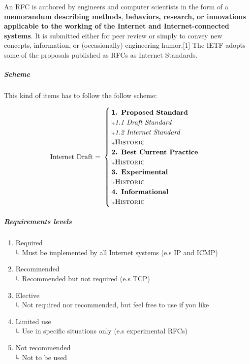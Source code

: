 An RFC is authored by engineers and computer scientists in the form of a \textbf{memorandum describing methods}, \textbf{behaviors, research, or innovations applicable to the working of the Internet and Internet-connected systems}. It is submitted either for peer review or simply to convey new concepts, information, or (occasionally) engineering humor.[1] The IETF adopts some of the proposals published as RFCs as Internet Standards.

\subparagraph{Scheme}
This kind of items has to follow the follow scheme:

\begin{equation}\text{Internet Draft = }
\begin{cases}
\text{\textbf{1. Proposed Standard}}\\\rotatebox[origin=c]{180}{$\Lsh$} \text{\textit{1.1 Draft Standard}}\\
\rotatebox[origin=c]{180}{$\Lsh$}
\text{\textit{1.2 Internet Standard}} \\ \rotatebox[origin=c]{180}{$\Lsh$} \text{\textsc{Historic}}\\
\text{\textbf{2. Best Current Practice}} \\ \rotatebox[origin=c]{180}{$\Lsh$} \text{\textsc{Historic}}\\
\text{\textbf{3. Experimental}}\\ \rotatebox[origin=c]{180}{$\Lsh$} \text{\textsc{Historic}}\\
\text{\textbf{4. Informational}}\\ \rotatebox[origin=c]{180}{$\Lsh$} \text{\textsc{Historic}}         
\end{cases}
\end{equation}

\subparagraph{Requirements levels}
\begin{enumerate}
\item Required\\ $\rotatebox[origin=c]{180}{$\Lsh$}$ Must be implemented by all Internet systems (e.s IP and ICMP)
\item Recommended\\$\rotatebox[origin=c]{180}{$\Lsh$}$ Recommended but not required (e.s TCP)
\item Elective\\$\rotatebox[origin=c]{180}{$\Lsh$}$ Not required nor recommended, but feel free to use if you like
\item Limited use\\$\rotatebox[origin=c]{180}{$\Lsh$}$ Use in specific situations only (e.s experimental RFCs)
\item Not recommended\\$\rotatebox[origin=c]{180}{$\Lsh$}$ Not to be used 
\end{enumerate}

